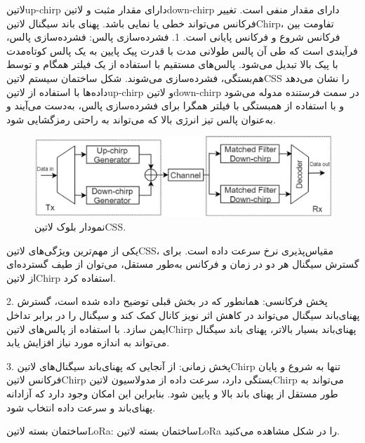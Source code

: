 ‌لاتین{up-chirp} دارای مقدار مثبت و ‌لاتین{down-chirp} دارای مقدار منفی است. تغییر فرکانس می‌تواند خطی یا نمایی باشد. پهنای باند سیگنال ‌لاتین{Chirp}، تفاومت بین فرکانس شروع و فرکانس پایانی است.
1. فشرده‌سازی پالس: فشرده‌سازی پالس، فرآیندی است که طی آن پالس طولانی مدت با قدرت پیک پایین به یک پالس کوتاه‌مدت با پیک بالا  تبدیل می‌شود. پالس‌های مستقیم با استفاده از یک فیلتر همگام و توسط هم‌بستگی، فشرده‌سازی می‌شوند. شکل  ساختمان سیستم ‌لاتین{CSS} را نشان می‌دهد داده‌ها با استفاده از ‌لاتین{up-chirp} و ‌لاتین{down-chirp} در سمت فرستنده مدوله می‌شود و با استفاده از همبستگی با فیلتر همگرا برای فشرده‌سازی پالس، به‌دست می‌آیند و به‌عنوان پالس تیز انرژی بالا که می‌تواند به راحتی رمزگشایی شود.

\begin{figure}[!h]
	\centering
	\includegraphics[width=\linewidth]{Assets/CSS.png}
	\caption{نمودار بلوک ‌لاتین{CSS}.}
	\label{fig:CSS}
\end{figure}

یکی از مهم‌ترین ویژگی‌های ‌لاتین{CSS}، مقیاس‌پذیری نرخ سرعت داده است. برای گسترش سیگنال هر دو در زمان و فرکانس به‌طور مستقل، می‌توان از طیف گسترده‌ای از ‌لاتین{Chirp} استفاده  کرد.

2. پخش فرکانسی: همانطور که در بخش قبلی توضیح داده شده است، گسترش پهنای‌باند سیگنال می‌تواند در کاهش اثر نویز کانال کمک کند و سیگنال را در برابر تداخل ایمن سازد. با استفاده از پالس‌های ‌لاتین{Chirp} پهنای‌باند بسیار بالاتر، پهنای باند سیگنال می‌تواند به اندازه مورد نیاز افزایش یابد.

3. پخش زمانی: از آنجایی که پهنای‌باند سیگنال‌های ‌لاتین{Chirp} تنها به شروع و پایان فرکانس ‌لاتین{Chirp} بستگی دارد، سرعت داده از مدولاسیون ‌لاتین{Chirp} می‌تواند به طور مستقل از پهنای باند بالا و پایین‌ شود. بنابراین این امکان وجود دارد که آزادانه پهنای‌باند و سرعت داده انتخاب شود.

ساختمان بسته ‌لاتین{LoRa}: ساختمان بسته ‌لاتین{LoRa} را در شکل  مشاهده می‌کنید.


